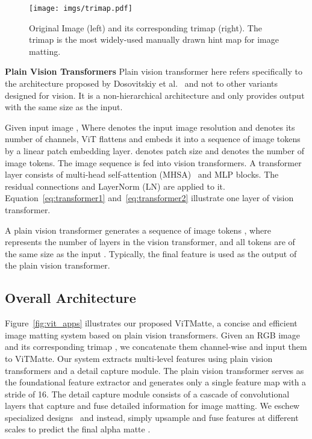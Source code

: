 \documentclass[10pt,twocolumn,letterpaper]{article}
\newcommand{\thename}{ViTMatte}
\begin{document}
\begin{figure}
    \centering
    \texttt{[image: imgs/trimap.pdf]}
    \caption{Original Image (left) and its corresponding trimap (right). The trimap is the most widely-used manually drawn hint map for image matting.}
    \label{fig:trimap}
\end{figure}



\textbf{Plain Vision Transformers}
Plain vision transformer here refers specifically to the architecture proposed by Dosovitskiy et al.~\cite{vit} and not to other variants designed for vision. It is a non-hierarchical architecture and only provides output with the same size as the input.

Given input image , Where  denotes the input image resolution and  denotes its number of channels, ViT flattens and embeds it into a sequence of image tokens  by a linear patch embedding layer.  denotes patch size and  denotes the number of image tokens. The image sequence is fed into vision transformers. A transformer layer consists of multi-head self-attention (MHSA)~\cite{NIPS2017_3f5ee243} and MLP blocks. The residual connections and LayerNorm (LN) are applied to it. Equation~\eqref {eq:transformer1} and~\eqref{eq:transformer2} illustrate one layer of vision transformer.




A plain vision transformer generates a sequence of image tokens , where  represents the number of layers in the vision transformer, and all tokens are of the same size as the input . Typically, the final feature  is used as the output of the plain vision transformer.

\subsection{Overall Architecture}
Figure~\ref{fig:vit_apps} illustrates our proposed \thename{}, a concise and efficient image matting system based on plain vision transformers. Given an RGB image  and its corresponding trimap , we concatenate them channel-wise and input them to \thename{}. Our system extracts multi-level features using plain vision transformers and a detail capture module. The plain vision transformer serves as the foundational feature extractor and generates only a single feature map with a stride of 16. The detail capture module consists of a cascade of convolutional layers that capture and fuse detailed information for image matting. We eschew specialized designs~\cite{MGM} and instead, simply upsample and fuse features at different scales to predict the final alpha matte .
\end{document}
